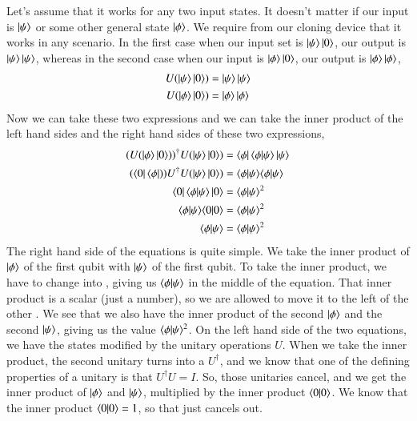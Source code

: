 Let's assume that it works for any two input states. It doesn't matter if our input is $\left| \psi \right\rangle$ or some other general state $\left| \phi \right\rangle$. We require from our cloning device that it works in any scenario. In the first case when our input set is $\left| \psi \right\rangle\left| 0 \right\rangle$, our output is $\left| \psi \right\rangle \left| \psi \right\rangle$, whereas in the second case when our input is $\left| \phi \right\rangle\left| 0 \right\rangle$, our output is $\left| \phi \right\rangle\left| \phi \right\rangle$,
\begin{equation}
\begin{aligned}
U(\left| \psi \right\rangle\left| 0 \right\rangle) &=\left| \psi \right\rangle\left| \psi \right\rangle \\
U(\left| \phi \right\rangle\left| 0 \right\rangle) &=\left| \phi \right\rangle\left| \phi \right\rangle
\end{aligned}
\end{equation}
Now we can take these two expressions and we can take the inner product of the left hand sides and the right hand sides of these two expressions,
\begin{equation}
\begin{aligned}
(U(\left| \phi \right\rangle\left| 0 \right\rangle))^{\dagger}U(\left| \psi \right\rangle\left| 0 \right\rangle) &= \left\langle \phi \right|\langle \phi|\psi \rangle\left| \psi \right\rangle \\
(\left\langle 0 \right|\left\langle \phi \right|))U^{\dagger}U(\left| \psi \right\rangle\left| 0 \right\rangle) &= \langle \phi|\psi \rangle\langle \phi|\psi \rangle \\
\left\langle 0 \right|\langle \phi|\psi \rangle\left| 0 \right\rangle &= \langle \phi|\psi \rangle^2\\
\langle \phi|\psi \rangle\langle 0|0 \rangle &= \langle \phi|\psi \rangle^2\\
\langle \phi|\psi \rangle &= \langle \phi|\psi \rangle^2
\end{aligned}
\end{equation}
The right hand side of the equations is quite simple. We take the inner product of $\left| \phi \right\rangle$ of the first qubit with $\left| \psi \right\rangle$ of the first qubit. To take the inner product, we have to change \ket{\phi} into \bra{\phi}, giving us $\langle \phi|\psi \rangle$ in the middle of the equation. That inner product is a scalar (just a number), so we are allowed to move it to the left of the other \ket{\phi}. We see that we also have the inner product of the second $\left| \phi \right\rangle$ and the second $\left| \psi \right\rangle$, giving us the value $\langle \phi|\psi \rangle^2$. On the left hand side of the two equations, we have the states modified by the unitary operations $U$.  When we take the inner product, the second unitary turns into a $U^\dagger$, and we know that one of the defining properties of a unitary is that $U^\dagger U = I$. So, those unitaries cancel, and we get the inner product of $\left| \phi \right\rangle$ and $\left| \psi \right\rangle$, multiplied by the inner product $\langle 0|0 \rangle$. We know that the inner product $\langle 0|0 \rangle = 1$, so that just cancels out.

